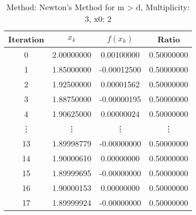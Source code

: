 \begin{table}
\centering
\caption{Method: Newton's Method for m > d, Multiplicity: 3, x0: 2}
\label{tab:table_Newton's_Method_for_m_>_d_3_2}
\begin{tabular}{c c c c}
\toprule
Iteration &      $x_k$ &    $f(x_k)$ &      Ratio \\
\midrule
        0 & 2.00000000 &  0.00100000 & 0.50000000 \\
        1 & 1.85000000 & -0.00012500 & 0.50000000 \\
        2 & 1.92500000 &  0.00001562 & 0.50000000 \\
        3 & 1.88750000 & -0.00000195 & 0.50000000 \\
        4 & 1.90625000 &  0.00000024 & 0.50000000 \\
   \vdots &     \vdots &      \vdots &     \vdots \\
       13 & 1.89998779 & -0.00000000 & 0.50000000 \\
       14 & 1.90000610 &  0.00000000 & 0.50000000 \\
       15 & 1.89999695 & -0.00000000 & 0.50000000 \\
       16 & 1.90000153 &  0.00000000 & 0.50000000 \\
       17 & 1.89999924 & -0.00000000 & 0.50000000 \\
\bottomrule
\end{tabular}
\end{table}
